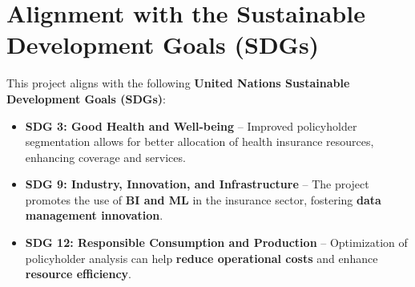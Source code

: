 \section{Alignment with the Sustainable Development 
Goals (SDGs)}

This project aligns with the following \textbf{United Nations 
Sustainable Development Goals (SDGs)}:

\begin{itemize}
    \item \textbf{SDG 3: Good Health and Well-being} – 
          Improved policyholder segmentation allows for 
          better allocation of health insurance resources, 
          enhancing coverage and services.
    \item \textbf{SDG 9: Industry, Innovation, and 
          Infrastructure} – The project promotes the use 
          of \textbf{BI and ML} in the insurance sector, 
          fostering \textbf{data management innovation}.
    \item \textbf{SDG 12: Responsible Consumption and 
          Production} – Optimization of policyholder 
          analysis can help \textbf{reduce operational 
          costs} and enhance \textbf{resource efficiency}.
\end{itemize}
